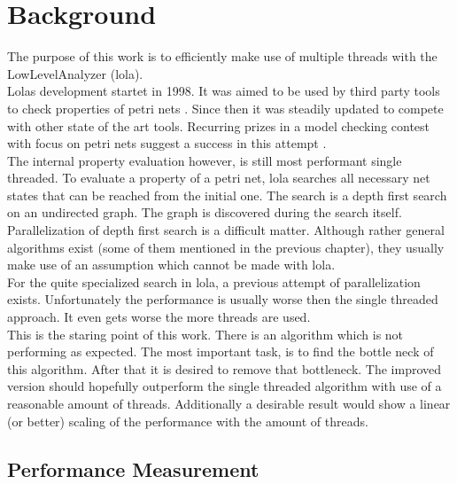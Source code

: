 \chapter{Background}

The purpose of this work is to efficiently make use of multiple threads with the LowLevelAnalyzer (lola).\\
Lolas development startet in 1998. It was aimed to be used by third party tools to check properties of petri nets \cite{schmidt2000lola}. Since then it was steadily updated to compete with other state of the art tools. Recurring prizes in a model checking contest with focus on petri nets suggest a success in this attempt \cite{MCC2017}.\\
The internal property evaluation however, is still most performant single threaded. To evaluate a property of a petri net, lola searches all necessary net states that can be reached from the initial one. The search is a depth first search on an undirected graph. The graph is discovered during the search itself.\\
Parallelization of depth first search is a difficult matter. Although rather general algorithms exist (some of them mentioned in the previous chapter), they usually make use of an assumption which cannot be made with lola.\\ %
For the quite specialized search in lola, a previous attempt of parallelization exists. Unfortunately the performance is usually worse then the single threaded approach. It even gets worse the more threads are used.\\
This is the staring point of this work. There is an algorithm which is not performing as expected. The most important task, is to find the bottle neck of this algorithm. After that it is desired to remove that bottleneck. The improved version should hopefully outperform the single threaded algorithm with use of a reasonable amount of threads. Additionally a desirable result would show a linear (or better) scaling of the performance with the amount of threads.

\section{Performance Measurement}
\label{benchmarking}
